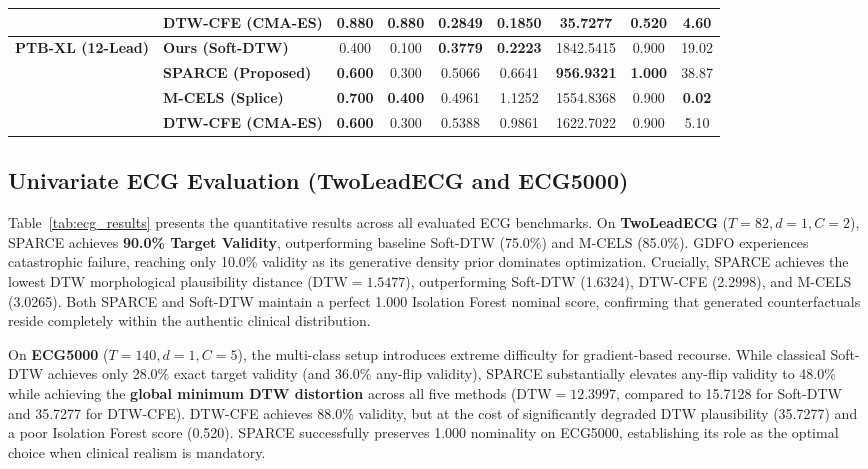 \documentclass[conference]{IEEEtran}
\begin{document}
\begin{table}[!t]
\begin{tabular}{llccccccc}
& \textbf{DTW-CFE (CMA-ES)} & \textbf{0.880} & \textbf{0.880} & \textbf{0.2849} & 0.1850 & 35.7277 & 0.520 & 4.60 \\
\midrule
\multirow{4}{*}{\textbf{PTB-XL (12-Lead)}} 
& \textbf{Ours (Soft-DTW)} & 0.400 & 0.100 & \textbf{0.3779} & \textbf{0.2223} & 1842.5415 & 0.900 & 19.02 \\
& \textbf{SPARCE (Proposed)} & \textbf{0.600} & 0.300 & 0.5066 & 0.6641 & \textbf{956.9321} & \textbf{1.000} & 38.87 \\
& \textbf{M-CELS (Splice)} & \textbf{0.700} & \textbf{0.400} & 0.4961 & 1.1252 & 1554.8368 & 0.900 & \textbf{0.02} \\
& \textbf{DTW-CFE (CMA-ES)} & \textbf{0.600} & 0.300 & 0.5388 & 0.9861 & 1622.7022 & 0.900 & 5.10 \\
\bottomrule
\end{tabular}
\end{table}

\subsection{Univariate ECG Evaluation (TwoLeadECG and ECG5000)}
Table~\ref{tab:ecg_results} presents the quantitative results across all evaluated ECG benchmarks.
On \textbf{TwoLeadECG} ($T=82, d=1, C=2$), SPARCE achieves \textbf{90.0\% Target Validity}, outperforming baseline Soft-DTW (75.0\%) and M-CELS (85.0\%). GDFO experiences catastrophic failure, reaching only 10.0\% validity as its generative density prior dominates optimization. Crucially, SPARCE achieves the lowest DTW morphological plausibility distance ($\text{DTW} = \mathbf{1.5477}$), outperforming Soft-DTW (1.6324), DTW-CFE (2.2998), and M-CELS (3.0265). Both SPARCE and Soft-DTW maintain a perfect 1.000 Isolation Forest nominal score, confirming that generated counterfactuals reside completely within the authentic clinical distribution.

On \textbf{ECG5000} ($T=140, d=1, C=5$), the multi-class setup introduces extreme difficulty for gradient-based recourse. While classical Soft-DTW achieves only 28.0\% exact target validity (and 36.0\% any-flip validity), SPARCE substantially elevates any-flip validity to 48.0\% while achieving the \textbf{global minimum DTW distortion} across all five methods ($\text{DTW} = \mathbf{12.3997}$, compared to 15.7128 for Soft-DTW and 35.7277 for DTW-CFE). DTW-CFE achieves 88.0\% validity, but at the cost of significantly degraded DTW plausibility (35.7277) and a poor Isolation Forest score (0.520). SPARCE successfully preserves 1.000 nominality on ECG5000, establishing its role as the optimal choice when clinical realism is mandatory.
\end{document}
